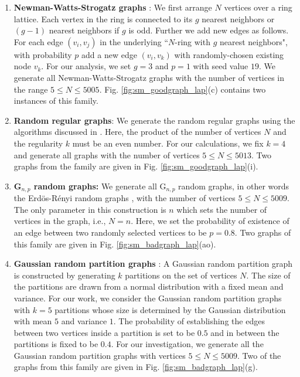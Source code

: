 \documentclass[%
 reprint,
 superscriptaddress,
 amsmath,amssymb,
 aps,
 pra,
floatfix,
nofootinbib,
]{revtex4-2}
\theoremstyle{definition}
\theoremstyle{remark}
\begin{document}
\begin{appendix}
\begin{enumerate}
		\item 
        \textbf{Newman-Watts-Strogatz graphs} \cite{newman1999renormalization}: We first arrange $N$ vertices over a ring lattice. Each vertex in the ring is connected to its $g$ nearest neighbors or $(g - 1)$ nearest neighbors if $g$ is odd. Further we add new edges as follows. For each edge $(v_i, v_j)$ in the underlying ``$N$-ring with $g$ nearest neighbors", with probability $p$ add a new edge $(v_i, v_k)$ with randomly-chosen existing node $v_k$. %
        For our analysis, we set $g=3$ and $p=1$ with seed value $19$. We generate all Newman-Watts-Strogatz graphs with the number of vertices in the range $5 \leq N \leq 5005$. Fig. \ref{fig:sm_goodgraph_lap}(c) contains two instances of this family. 
        
		\item 
        \textbf{Random regular graphs}: We generate the random regular graphs using the algorithms discussed in \cite{steger1999generating, kim2003generating}. Here, the product of the number of vertices $N$ and the regularity $k$ must be an even number. For our calculations, we fix $k = 4$ and generate all graphs with the number of vertices $5 \leq N \leq 5013$. Two graphs from the family are given in Fig. \ref{fig:sm_goodgraph_lap}(i).
        
		\item 
        \textbf{G$_{n,p}$ random graphs:} We generate all G$_{n,p}$ random graphs, in other words the Erd\"{o}s-R\'{e}nyi random graphs \cite{erdds1959random}, with the number of vertices $5 \leq N \leq 5009$. The only parameter in this construction is $n$ which sets the number of vertices in the graph, i.e., $N=n$. Here, we set the probability of existence of an edge between two randomly selected vertices to be $p = 0.8$. Two graphs of this family are given in Fig. \ref{fig:sm_badgraph_lap}(ao).
        
		\item 
        \textbf{Gaussian random partition graphs} 
        \cite{brandes2003experiments}: A Gaussian random partition graph is constructed by generating $k$ partitions on the set of vertices $N$. The size of the partitions are drawn from a normal distribution with a fixed mean and variance. For our work, we consider the Gaussian random partition graphs with $k=5$ partitions whose size is determined by the Gaussian distribution with mean $5$ and variance $1$. The probability of establishing the edges between two vertices inside a partition is set to be $0.5$ and in between the partitions is fixed to be $0.4$. For our investigation, we generate all the Gaussian random partition graphs with vertices $5 \leq N \leq 5009$. Two of the graphs from this family are given in Fig. \ref{fig:sm_badgraph_lap}(g). 
        

\end{enumerate}
\end{appendix}
\end{document}
